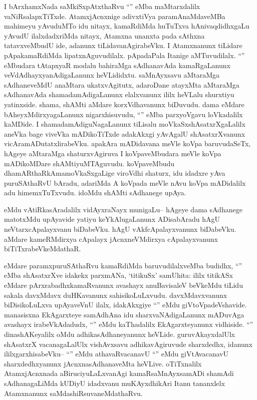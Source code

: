 \begin{artha}
I bArxhamxNada saMkiSxpAtxthaRvu ``\stext'' eMba maMtarxdalilx vaNiRsalapxTiTxde. AtamxjAcnxnige adivxtiVya paramAnaMdaveMBa mahimeyu yAvuduMTo idu nitayx, kamaRdiMda huTuTxva hAnivaqdidhxgaLu yAvudU ilalxdadxriMda nitayx, Atamxna unanxta pada sAthxna tatavxveMbudU ide, adanunx tiLidavanAgirabeVku. I Atamxnanunx tiLidare pApakamaRdiMda lipatxnAguvudilalx. pApadaPala Itanige aMTuvudilalx. ``\stext'' eMbudara tAtapxyaR modalu bahiraMga sAdhanavAda kamaRgaLanunx veVdAdhayxyanAdigaLanunx heVLididxtu. saMnAyxsavu aMtaraMga sAdhaneveMdU anaMtara ukatxvAgitutx, adaroDane atayxMta aMtaraMga sAdhanavAda shamadamAdigaLanunx elalxvanunx ililx heVLalu shurxtiyu yatinxside. shama, shAMti aMdare korxVdhavanunx biDuvudu. dama eMdare bAheyxMdirxyagaLanunx nigarxhisuvudu, ``\stext'' eMba parxyoVgavu loVkadalilx kaMDide. I shamadamAdiguNagaLanunx tiLisalu moVkaSxshAsatxrXgaLalilx aneVka bage viveVka mADikoTiTxde adakAkxgi yAvAgalU shAsatxrXvanunx vicAramADutatxlirabeVku. apakAra mADidavana meVle koVpa baruvudaSeTx, hAgeye aMtaraMga shaturxvAgiruva I koVpaveMbudara meVle koVpa mADikoMDare shAMtiyuMTAguvudu. koVpaveMbudu dhamARthaRkAmamoVkaSxgaLige viroVdhi shaturx, idu idadxre yAva puruSAthaRvU bAradu, adariMda A koVpada meVle nAvu koVpa mADidalilx adu himemxTuTxvudu. idoMdu shAMti sAdhanege upAya. 
\end{artha}

\begin{artha}
eMdu vAtiRkasAradalilx vidAyxraNayx munigaLu-- hAgeye dama sAdhanege matotxMdu upAyavide yatiyu keYkAlugaLanunx ADisabAradu hAgU neVtarxcApalayxvanu biDabeVku. hAgU vAkfcApalayxvanunx biDabeVku. aMdare kameRMdirxya cApalayx jAcnxneVMdirxya cApalayxvanunx biTiTxrabeVkeMdathaR. 
\end{artha}


\begin{artha}
eMdare paramxpuruSAthaRvu kamaRdiMda baruvudilalxveMba budidhx, ``\stext'' eMba shAsatxrXve idakekx parxmANa, `titikuSx' samUhita: ililx titikASx eMdare pArxrabadhxkamaRvanunx avashayx anuBavisaleV beVkeMdu tiLidu sakala davxMdavx duHKavanunx sahisikoLuLxvudu. davxMdavxvanunx biDisikoLuLxva upAyaveVnU ilalx, idakAkxgiye ``\stext'' eMdu giVtoVpadeVshavide. manasisxna EkAgarxteye samAdhAna idu sharxvaNAdigaLanunx mADuvAga avashayx irabeVkAdadudx, ``\stext'' eMdu kaThadalilx EkAgarxteyanunx vidhiside. ``\stext'' dinashAKeyalilx oMdu adhikasAdhaneyanunx heVLide. guruvAkayxdalUlx shAsatxrX vacanagaLalUlx vishAvxsavu adhikavAgiruvude sharxdedhx, idanunx ililxgarxhisabeVku-- ``\stext'' eMdu athavaRvacanavU ``\stext'' eMdu giVtAvacanavU sharxdedhxyanunx jAcnxnasAdhanaveMta heVLive. oTiTxnalilx AtamxjAcnxnada aBiruciyuLaLxvanAgi kamaRsaMnAyxsamADi shamAdi sAdhanagaLiMda kUDiyU idadxvanu muKAyxdhikAri Itanu tananxlelx Atamxnanunx saMdashiRsuvaneMdathaRvu.
\end{artha}

